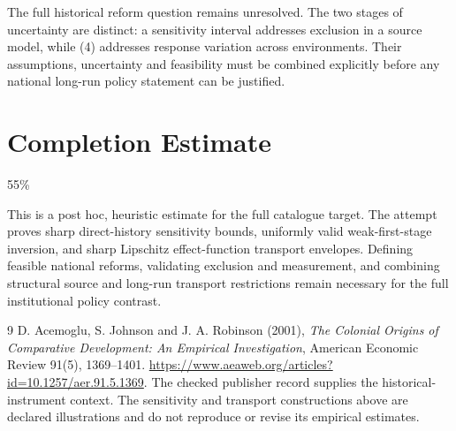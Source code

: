 \documentclass[11pt,a4paper]{article}
\begin{document}
The full historical reform question remains unresolved. The two stages of uncertainty are distinct: a sensitivity interval addresses exclusion in a source model, while (4) addresses response variation across environments. Their assumptions, uncertainty and feasibility must be combined explicitly before any national long-run policy statement can be justified.

\section{Completion Estimate}
55\%

This is a post hoc, heuristic estimate for the full catalogue target.
The attempt proves sharp direct-history sensitivity bounds, uniformly valid weak-first-stage inversion, and sharp Lipschitz effect-function transport envelopes. Defining feasible national reforms, validating exclusion and measurement, and combining structural source and long-run transport restrictions remain necessary for the full institutional policy contrast.

\begin{thebibliography}{9}
 D. Acemoglu, S. Johnson and J. A. Robinson (2001), \emph{The Colonial Origins of Comparative Development: An Empirical Investigation}, American Economic Review 91(5), 1369--1401. \url{https://www.aeaweb.org/articles?id=10.1257/aer.91.5.1369}. The checked publisher record supplies the historical-instrument context. The sensitivity and transport constructions above are declared illustrations and do not reproduce or revise its empirical estimates.
\end{thebibliography}
\end{document}

